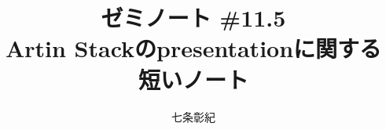 \documentclass[a4paper, dvipdfmx]{jsarticle}
\begin{document}
\title{ゼミノート \#11.5 \\ Artin Stackのpresentationに関する短いノート}
\author{七条彰紀}
\maketitle
\tableofcontents
\vspace{10pt}



\end{document}
